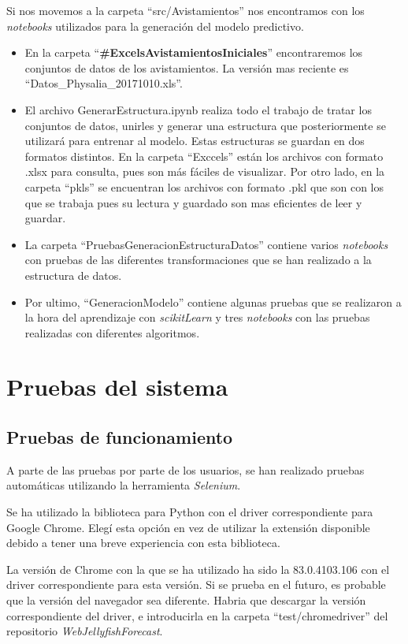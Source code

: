 Si nos movemos a la carpeta ``src/Avistamientos'' nos encontramos con los \emph{notebooks} utilizados para la generación del modelo predictivo.
\begin{itemize}
	\item En la carpeta ``\textbf{\#ExcelsAvistamientosIniciales}'' encontraremos los conjuntos de datos de los avistamientos. La versión mas reciente es ``Datos\_Physalia\_20171010.xls''.
	\item El archivo GenerarEstructura.ipynb realiza todo el trabajo de tratar los conjuntos de datos, unirles y generar una estructura que posteriormente se utilizará para entrenar al modelo. Estas estructuras se guardan en dos formatos distintos. En la carpeta ``Exccels'' están los archivos con formato .xlsx para consulta, pues son más fáciles de visualizar. Por otro lado, en la carpeta ``pkls'' se encuentran los archivos con formato .pkl que son con los que se trabaja pues su lectura y guardado son mas eficientes de leer y guardar.
	\item La carpeta ``PruebasGeneracionEstructuraDatos'' contiene varios \emph{notebooks} con pruebas de las diferentes transformaciones que se han realizado a la estructura de datos. 
	\item Por ultimo, ``GeneracionModelo'' contiene algunas pruebas que se realizaron a la hora del aprendizaje con \emph{scikitLearn} y tres \emph{notebooks} con las  pruebas realizadas con diferentes algoritmos.
\end{itemize}

\section{Pruebas del sistema}

\subsection{Pruebas de funcionamiento}
A parte de las pruebas por parte de los usuarios, se han realizado pruebas automáticas utilizando la herramienta \emph{Selenium}.

Se ha utilizado la biblioteca para Python con el driver correspondiente para Google Chrome. Elegí esta opción en vez de utilizar la extensión disponible debido a tener una breve experiencia con esta biblioteca. 

La versión de Chrome con la que se ha utilizado ha sido la 83.0.4103.106 con el driver correspondiente para esta versión. Si se prueba en el futuro, es probable que la versión del navegador sea diferente. Habria que descargar la versión correspondiente del driver, e introducirla en la carpeta ``test/chromedriver'' del repositorio \emph{WebJellyfishForecast}.

